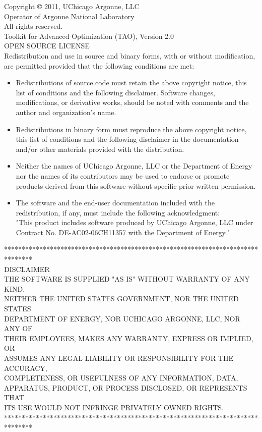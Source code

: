 \noindent
Copyright © 2011, UChicago Argonne, LLC \\
Operator of Argonne National Laboratory \\
All rights reserved. \\
Toolkit for Advanced Optimization (TAO), Version 2.0 \\
OPEN SOURCE LICENSE \\

\noindent
Redistribution and use in source and binary forms, with or without modification, are permitted provided that the following conditions are met:
\begin{itemize}
\item    Redistributions of source code must retain the above copyright notice, this list of conditions and the following disclaimer. Software changes, modifications, or derivative works, should be noted with comments and the author and organization's name. \\
\item    Redistributions in binary form must reproduce the above copyright notice, this list of conditions and the following disclaimer in the documentation and/or other materials provided with the distribution. \\
\item    Neither the names of UChicago Argonne, LLC or the Department of Energy nor the names of its contributors may be used to endorse or promote products derived from this software without specific prior written permission. \\
\item    The software and the end-user documentation included with the redistribution, if any, must include the following acknowledgment:\\
    "This product includes software produced by UChicago Argonne, LLC under Contract No. DE-AC02-06CH11357 with the Department of Energy." 
\end{itemize}

\noindent
********************************************************************************\\
\noindent
DISCLAIMER \\

\noindent
THE SOFTWARE IS SUPPLIED "AS IS" WITHOUT WARRANTY OF ANY KIND.\\
NEITHER THE UNITED STATES GOVERNMENT, NOR THE UNITED STATES\\
DEPARTMENT OF ENERGY, NOR UCHICAGO ARGONNE, LLC, NOR ANY OF\\
THEIR EMPLOYEES, MAKES ANY WARRANTY, EXPRESS OR IMPLIED, OR\\
ASSUMES ANY LEGAL LIABILITY OR RESPONSIBILITY FOR THE ACCURACY,\\
COMPLETENESS, OR USEFULNESS OF ANY INFORMATION, DATA,\\
APPARATUS, PRODUCT, OR PROCESS DISCLOSED, OR REPRESENTS THAT\\
ITS USE WOULD NOT INFRINGE PRIVATELY OWNED RIGHTS.\\

\noindent
********************************************************************************\\
